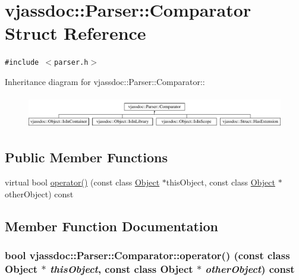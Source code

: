 \hypertarget{structvjassdoc_1_1Parser_1_1Comparator}{
\section{vjassdoc::Parser::Comparator Struct Reference}
\label{structvjassdoc_1_1Parser_1_1Comparator}
}
{\tt \#include $<$parser.h$>$}

Inheritance diagram for vjassdoc::Parser::Comparator::\begin{figure}[H]
\begin{center}
\leavevmode
\includegraphics[height=1.45078cm]{structvjassdoc_1_1Parser_1_1Comparator}
\end{center}
\end{figure}
\subsection*{Public Member Functions}
\begin{CompactItemize}
\item 
virtual bool \hyperlink{structvjassdoc_1_1Parser_1_1Comparator_c27d6790182d87751bcf134a0d01481a}{operator()} (const class \hyperlink{classvjassdoc_1_1Object}{Object} $\ast$thisObject, const class \hyperlink{classvjassdoc_1_1Object}{Object} $\ast$otherObject) const 
\end{CompactItemize}


\subsection{Member Function Documentation}
\hypertarget{structvjassdoc_1_1Parser_1_1Comparator_c27d6790182d87751bcf134a0d01481a}{
\subsubsection{\setlength{\rightskip}{0pt plus 5cm}bool vjassdoc::Parser::Comparator::operator() (const class {\bf Object} $\ast$ {\em thisObject}, const class {\bf Object} $\ast$ {\em otherObject}) const}}
\label{structvjassdoc_1_1Parser_1_1Comparator_c27d6790182d87751bcf134a0d01481a}




